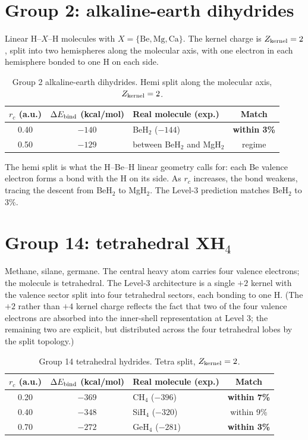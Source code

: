 \section{Group 2: alkaline-earth dihydrides}\label{sec:group2}

Linear H--$X$--H molecules with $X = \{\text{Be}, \text{Mg}, \text{Ca}\}$. The kernel charge is $Z_{\rm kernel} = 2$, split into two hemispheres along the molecular axis, with one electron in each hemisphere bonded to one H on each side.

\begin{table}[h]
\centering\small
\caption{Group 2 alkaline-earth dihydrides. Hemi split along the molecular axis, $Z_{\rm kernel} = 2$.}\label{tab:group2}
\begin{tabular}{c c l c}
\toprule
$r_c$ (a.u.) & $\Delta E_{\rm bind}$ (kcal/mol) & Real molecule (exp.) & Match \\
\midrule
0.40 & $-140$ & BeH$_2$ ($-144$)                & \textbf{within 3\%} \\
0.50 & $-129$ & between BeH$_2$ and MgH$_2$     & regime \\
\bottomrule
\end{tabular}
\end{table}

The hemi split is what the H--Be--H linear geometry calls for: each Be valence electron forms a bond with the H on its side. As $r_c$ increases, the bond weakens, tracing the descent from BeH$_2$ to MgH$_2$. The Level-3 prediction matches BeH$_2$ to 3\%.

\section{Group 14: tetrahedral XH$_4$}\label{sec:group14}

Methane, silane, germane. The central heavy atom carries four valence electrons; the molecule is tetrahedral. The Level-3 architecture is a single $+2$ kernel with the valence sector split into four tetrahedral sectors, each bonding to one H. (The $+2$ rather than $+4$ kernel charge reflects the fact that two of the four valence electrons are absorbed into the inner-shell representation at Level 3; the remaining two are explicit, but distributed across the four tetrahedral lobes by the split topology.)

\begin{table}[h]
\centering\small
\caption{Group 14 tetrahedral hydrides. Tetra split, $Z_{\rm kernel} = 2$.}\label{tab:group14}
\begin{tabular}{c c l c}
\toprule
$r_c$ (a.u.) & $\Delta E_{\rm bind}$ (kcal/mol) & Real molecule (exp.) & Match \\
\midrule
0.20 & $-369$ & CH$_4$  ($-396$)  & \textbf{within 7\%} \\
0.40 & $-348$ & SiH$_4$ ($-320$)  & within 9\% \\
0.70 & $-272$ & GeH$_4$ ($-281$)  & \textbf{within 3\%} \\
\bottomrule
\end{tabular}
\end{table}

